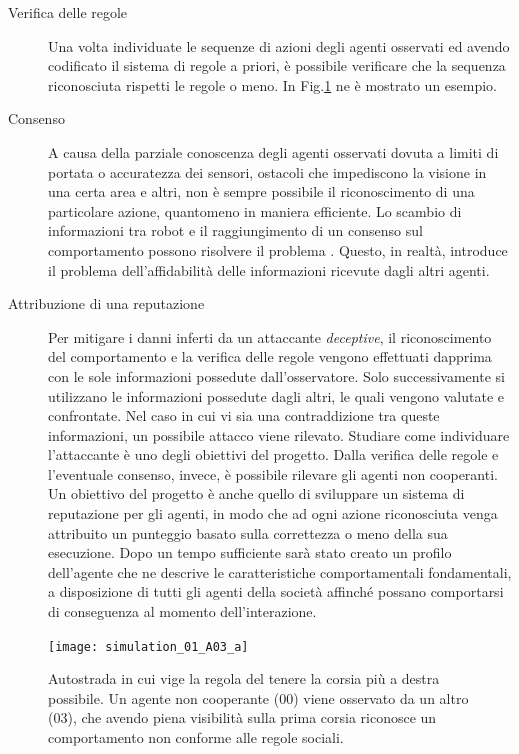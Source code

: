 \documentclass[paper=a4, fontsize=11pt]{scrartcl} %
\numberwithin{equation}{section} %
\numberwithin{table}{section} %
\begin{document}
\begin{description}
\item[Verifica delle regole] Una volta individuate le sequenze di azioni 
	degli agenti osservati ed avendo codificato il sistema di regole
	a priori, è possibile verificare che la sequenza riconosciuta rispetti le regole o meno. In Fig.\ref{img:noright} ne è mostrato un esempio. 
\item[Consenso] A causa della parziale conoscenza degli agenti osservati
dovuta a limiti di portata o accuratezza dei sensori, ostacoli che impediscono
la visione in una certa area e altri, non è sempre possibile il riconoscimento di una particolare azione, quantomeno in maniera efficiente.
Lo scambio di informazioni tra robot e il raggiungimento di un consenso 
sul comportamento possono risolvere il problema \cite{consensus}. Questo, in realtà, 
introduce il problema dell'affidabilità delle informazioni ricevute dagli 
altri agenti.  
\item[Attribuzione di una reputazione] Per mitigare i danni inferti 
da un attaccante \textit{deceptive},
il riconoscimento del comportamento e la verifica delle regole vengono
effettuati dapprima con le sole informazioni possedute dall'osservatore.
Solo successivamente si utilizzano le informazioni possedute dagli altri, le quali vengono valutate e confrontate. Nel caso in cui vi sia una contraddizione tra queste informazioni, un possibile attacco viene rilevato. Studiare come individuare l'attaccante è uno degli obiettivi del progetto. Dalla verifica delle 
regole e l'eventuale consenso, invece, è possibile rilevare gli agenti non cooperanti. Un obiettivo del progetto è anche quello di sviluppare
un sistema di reputazione per gli agenti, in modo che ad ogni azione 
riconosciuta venga attribuito un punteggio basato sulla correttezza o meno
della sua esecuzione. Dopo un tempo sufficiente sarà stato creato 
un profilo dell'agente che ne descrive le caratteristiche comportamentali fondamentali, a disposizione di tutti gli agenti della società affinché possano comportarsi di conseguenza al momento dell'interazione.
\end{description}

\begin{figure}[ht]
\centering
\texttt{[image: simulation\_01\_A03\_a]}
\caption{Autostrada in cui vige la regola del tenere la corsia più a destra possibile. Un agente non cooperante (00) viene osservato da un altro (03), 
che avendo piena visibilità sulla prima corsia riconosce un comportamento
non conforme alle regole sociali.}
\label{img:noright}
\end{figure}
\end{document}

